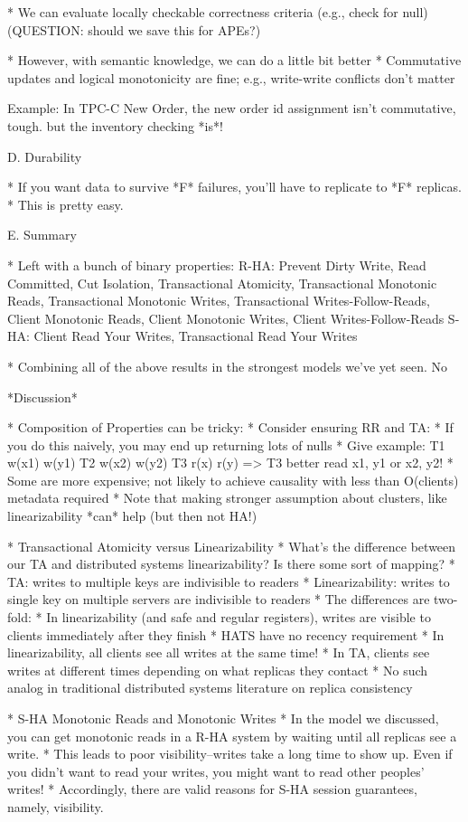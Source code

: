 * We can evaluate locally checkable correctness criteria (e.g., check for null)
	(QUESTION: should we save this for APEs?)

* However, with semantic knowledge, we can do a little bit better
	* Commutative updates and logical monotonicity are fine; e.g., write-write conflicts don't matter
	
Example: In TPC-C New Order, the new order id assignment isn't commutative, tough. but the inventory checking *is*!

D. Durability

* If you want data to survive *F* failures, you'll have to replicate to *F* replicas.
	* This is pretty easy.

E. Summary

* Left with a bunch of binary properties: 
R-HA: Prevent Dirty Write, Read Committed, Cut Isolation, Transactional Atomicity, Transactional Monotonic Reads, Transactional Monotonic Writes, Transactional Writes-Follow-Reads, Client Monotonic Reads, Client Monotonic Writes, Client Writes-Follow-Reads
S-HA: Client Read Your Writes, Transactional Read Your Writes

* Combining all of the above results in the strongest models we've yet seen. No

*Discussion*

* Composition of Properties can be tricky:
	* Consider ensuring RR and TA:
		* If you do this naively, you may end up returning lots of nulls
		* Give example: T1 w(x1) w(y1) T2 w(x2) w(y2) T3 r(x) r(y) => T3 better read x1, y1 or x2, y2!
	* Some are more expensive; not likely to achieve causality with less than O(clients) metadata required
		* Note that making stronger assumption about clusters, like linearizability *can* help (but then not HA!)

* Transactional Atomicity versus Linearizability
	* What's the difference between our TA and distributed systems linearizability? Is there some sort of mapping?
		* TA: writes to multiple keys are indivisible to readers
		* Linearizability: writes to single key on multiple servers are indivisible to readers
	* The differences are two-fold:
		* In linearizability (and safe and regular registers), writes are visible to clients immediately after they finish
			* HATS have no recency requirement
		* In linearizability, all clients see all writes at the same time!
			* In TA, clients see writes at different times depending on what replicas they contact
			* No such analog in traditional distributed systems literature on replica consistency
	
* S-HA Monotonic Reads and Monotonic Writes
	* In the model we discussed, you can get monotonic reads in a R-HA system by waiting until all replicas see a write.
	* This leads to poor visibility--writes take a long time to show up. Even if you didn't want to read your writes, you might want to read other peoples' writes!
	* Accordingly, there are valid reasons for S-HA session guarantees, namely, visibility.
